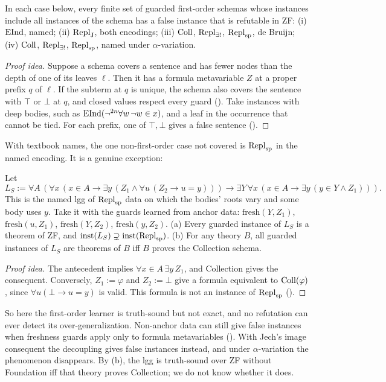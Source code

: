 \begin{theorem}\label{thm:zf:nounion}
In each case below, every finite set of guarded first-order schemas whose instances include all instances of the
schema has a false instance that is refutable in ZF: (i) $\mathrm{EInd}$, named; (ii) $\mathrm{Repl}_{\mathrm{J}}$, both encodings; (iii)
$\mathrm{Coll}$, $\mathrm{Repl}_{\exists!}$, $\mathrm{Repl}_{\mathrm{sp}}$, de Bruijn; (iv) $\mathrm{Coll}$, $\mathrm{Repl}_{\exists!}$, $\mathrm{Repl}_{\mathrm{sp}}$, named under $\alpha$-variation.
\end{theorem}
\begin{proof}[Proof idea]
Suppose a schema covers a sentence and has fewer nodes than the depth of one of its leaves $\ell$. Then it has a
formula metavariable $Z$ at a proper prefix $q$ of $\ell$. If the subterm at $q$ is unique, the schema also covers the
sentence with $\top$ or $\bot$ at $q$, and closed values respect every guard (). Take instances
with deep bodies, such as $\mathrm{EInd}(\neg^{2n}\forall w\,\neg w\in x)$, and a leaf in the occurrence that cannot be tied.
For each prefix, one of $\top,\bot$ gives a false sentence ().
\end{proof}
With textbook names, the one non-first-order case not covered is $\mathrm{Repl}_{\mathrm{sp}}$ in the named encoding. It is a genuine
exception:

\begin{proposition}\label{prop:zf:coll}
Let
\[L_S:=\forall A\,(\forall x\,(x\in A\to\exists y\,(Z_1\wedge\forall u\,(Z_2\to u=y)))\to\exists Y\,\forall x\,(x\in
A\to\exists y\,(y\in Y\wedge Z_1))).\]
This is the named lgg of $\mathrm{Repl}_{\mathrm{sp}}$ data on which the bodies' roots vary and some body uses $y$.
Take it with the guards learned from anchor data: $\mathrm{fresh}(Y,Z_1)$, $\mathrm{fresh}(u,Z_1)$,
$\mathrm{fresh}(Y,Z_2)$, $\mathrm{fresh}(y,Z_2)$.
(a) Every guarded instance of $L_S$ is a theorem of ZF, and $\mathrm{inst}(L_S)\supsetneq\mathrm{inst}(\mathrm{Repl}_{\mathrm{sp}})$.
(b) For any theory $B$, all guarded instances of $L_S$ are theorems of $B$ iff $B$ proves the Collection schema.
\end{proposition}
\begin{proof}[Proof idea]
The antecedent implies $\forall x{\in}A\,\exists y\,Z_1$, and Collection gives the consequent. Conversely, $Z_1:=\varphi$
and $Z_2:=\bot$ give a formula equivalent to $\mathrm{Coll}(\varphi)$, since $\forall u(\bot\to u=y)$ is valid. This formula is
not an instance of $\mathrm{Repl}_{\mathrm{sp}}$ ().
\end{proof}
So here the first-order learner is truth-sound but not exact, and no refutation can ever detect its
over-generalization. Non-anchor data can still give false instances when freshness guards apply only to formula
metavariables (). With Jech's image consequent the decoupling gives false instances instead, and
under $\alpha$-variation the phenomenon disappears. By (b), the lgg is truth-sound over ZF without Foundation iff that
theory proves Collection; we do not know whether it does.

